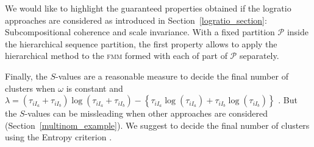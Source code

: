 \documentclass[submit]{smj}
\theoremstyle{definition}
\newcommand{\fmm}{\textsc{fmm}\xspace}
\begin{document}
We would like to highlight the guaranteed properties obtained if the logratio approaches are considered as introduced in Section~\ref{logratio_section}: Subcompositional coherence and scale invariance. With a fixed partition $\mathcal{P}$ inside the hierarchical sequence partition, the first property allows to apply the hierarchical method to the \fmm formed with each of part of $\mathcal{P}$ separately.

Finally, the $S$-values are a reasonable measure to decide the final number of clusters when $\omega$ is constant and $\lambda = (\tau_{iI_a}+\tau_{iI_b}) \log(\tau_{iI_a} + \tau_{iI_b}) - \left\{ \tau_{iI_a} \log(\tau_{iI_a}) + \tau_{iI_b} \log(\tau_{iI_b}) \right\}$ \citep{baudry2010combining}. But the $S$-values can be missleading when other approaches are considered (Section~\ref{multinom_example}). We suggest to decide the final number of clusters using the Entropy criterion \citep{baudry2010combining}.


\newpage
\end{document}
